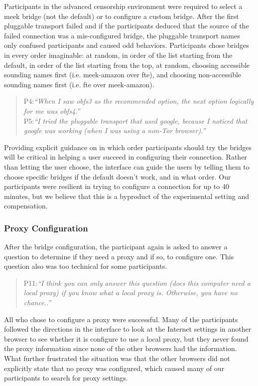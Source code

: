 \documentclass[USenglish,oneside,twocolumn]{article}
\begin{document}
Participants in the advanced censorship environment were required to select a meek bridge (not the default) or to configure a custom bridge. After the first pluggable transport failed and if the participants deduced that the source of the failed connection was a mis-configured bridge, the pluggable transport names only confused participants and caused odd behaviors. Participants chose bridges in every order imaginable: at random, in order of the list starting from the default, in order of the list starting from the top, at random, choosing accessible sounding names first (i.e. meek-amazon over fte), and choosing non-accessible sounding names first (i.e. fte over meek-amazon). 

\begin{quotation}
\noindent P4:\textit{``When I saw obfs3 as the recommended option, the next option logically for me was obfs4.''}\\

\noindent P5:\textit{``I tried the pluggable transport that used google, because I noticed that google was working (when I was using a non-Tor browser).''}
\end{quotation} 

Providing explicit guidance on in which order participants should try the bridges will be critical in helping a user succeed in configuring their connection. Rather than letting the user choose, the interface can guide the users by telling them to choose specific bridges if the default doesn't work, and in what order. Our participants were resilient in trying to configure a connection for up to 40 minutes, but we believe that this is a byproduct of the experimental setting and compensation. \\

\subsubsection{Proxy Configuration} 
After the bridge configuration, the participant again is asked to answer a question to determine if they need a proxy and if so, to configure one. This question also was too technical for some participants.

\begin{quotation}
\noindent P11:\textit{``I think you can only answer this question (does this computer need a local proxy) if you know what a local proxy is. Otherwise, you have no chance..''}
\end{quotation}

All who chose to configure a proxy were successful. Many of the participants followed the directions in the interface to look at the Internet settings in another browser to see whether it is configure to use a local proxy, but they never found the proxy information since none of the other browsers had the information. What further frustrated the situation was that the other browsers did not explicitly state that no proxy was configured, which caused many of our participants to search for proxy settings.
\end{document}
